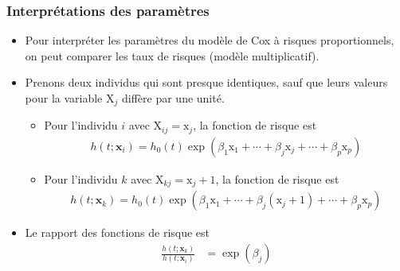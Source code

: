 \documentclass{beamer}
\begin{document}
\begin{frame}
\frametitle{Interprétations des paramètres}
\begin{itemize}
\item Pour interpréter les paramètres du modèle de Cox à risques proportionnels, on peut comparer les taux de risques (modèle multiplicatif). 
\item Prenons deux individus qui sont presque identiques, sauf que leurs valeurs pour la variable $\mathrm{X}_j$ diffère par une unité. 
\begin{itemize}
\vp \vp
\item Pour l'individu $i$ avec $\mathrm{X}_{ij}=\mathrm{x}_j$, la fonction de risque est
\begin{align*}
h(t; \mathbf{x}_i) = h_0(t) \exp(\beta_1 \mathrm{x}_1 + \cdots + \beta_j \mathrm{x}_j+\cdots + \beta_p \mathrm{x}_p)
\end{align*}
\item Pour l'individu $k$ avec $\mathrm{X}_{kj}=\mathrm{x}_j+1$, la fonction de risque est
\begin{align*}
h(t; \mathbf{x}_k) = h_0(t) \exp(\beta_1 \mathrm{x}_1 + \cdots + \beta_j (\mathrm{x}_j+1)+\cdots + \beta_p \mathrm{x}_p)
\end{align*}
\end{itemize}
\item Le \alert{rapport} des fonctions de risque  est
\begin{align*}
\frac{h(t; \mathbf{x}_k)}{h(t; \mathbf{x}_i)} &= 
 \exp(\beta_j)
\end{align*}
\end{itemize}
\end{frame}
\end{document}
